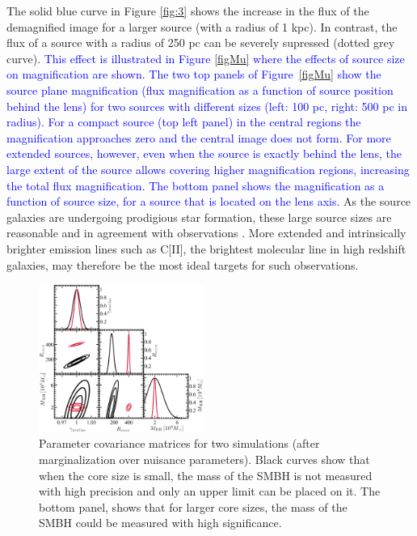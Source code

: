 \documentclass[chicago]{emulateapj}
\newcommand{\blue}{\textcolor{blue}}
\begin{document}
The solid blue curve in Figure \ref{fig:3} shows the increase in 
the flux of the demagnified image for a larger source (with a 
radius of 1 kpc). In contrast, the flux of a source with a radius 
of 250 pc can be severely supressed (dotted grey curve). \blue{This 
effect is illustrated in Figure \ref{figMu} where the effects of 
source size on magnification are shown. The two top panels of 
Figure~\ref{figMu} show the source plane magnification (flux 
magnification as a function of source position behind the lens) for 
two sources with different sizes (left: 100 pc, right: 500 pc in 
radius). For a compact source (top left panel) in the central 
regions the magnification approaches zero and the central image 
does not form. For more extended sources, however, even when the 
source is exactly behind the lens, the large extent of the source 
allows covering higher magnification regions, increasing the total 
flux magnification.
The bottom panel shows the magnification as a function of source 
size, for a source that is located on the lens axis.}
As the source galaxies are undergoing prodigious star formation, 
these large source sizes are reasonable and in agreement with 
observations \citep{hezaveh:13b}.
More extended and intrinsically brighter emission lines such as 
C[II], the brightest molecular line in high redshift galaxies, may 
therefore be the most ideal targets for such observations.

\begin{figure}
\begin{center}
\centering
\includegraphics[trim= 2 5 0 0, clip, width=0.48\textwidth]{figures/f_04.eps}
\centering
\end{center}
\caption{ Parameter covariance matrices for two simulations (after marginalization over nuisance parameters). Black curves show that when the core size is small, the mass of the SMBH is not measured with high precision and only an upper limit can be placed on it. The bottom panel, shows that for larger core sizes, the mass of the SMBH could be measured with high significance. 
\label{fig:4}}
\end{figure}
\end{document}
